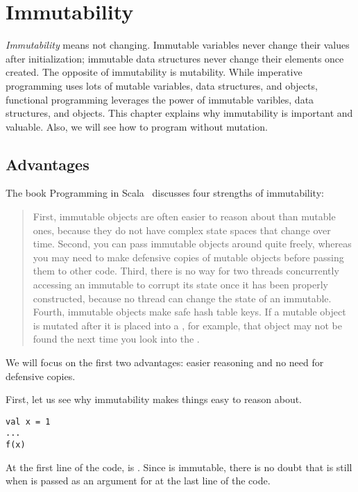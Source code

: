 \setchapterpreamble[u]{\margintoc}
\chapter{Immutability}

\textit{Immutability} means not changing.
Immutable variables never change their values
after initialization; immutable data structures never change their elements
once created. The opposite of immutability is mutability. While imperative
programming uses lots of mutable variables, data structures, and objects,
functional programming leverages the power of immutable varibles, data
structures, and objects. This chapter explains why immutability is important and
valuable. Also, we will see how to program without mutation.

\section{Advantages}

The book Programming in Scala~\cite{programming-in-scala}
discusses four strengths of immutability:

\begin{quote}
First, immutable objects are often easier to reason about than mutable ones,
because they do not have complex state spaces that change over time. Second, you
can pass immutable objects around quite freely, whereas you may need to make
defensive copies of mutable objects before passing them to other code. Third,
there is no way for two threads concurrently accessing an immutable to corrupt
its state once it has been properly constructed, because no thread can change the
state of an immutable. Fourth, immutable objects make safe hash table keys. If a
mutable object is mutated after it is placed into a , for example,
that object may not be found the next time you look into the .
\end{quote}

We will focus on the first two advantages:
easier reasoning and no need for defensive copies.

First, let us see why immutability makes things easy to reason about.

\begin{verbatim}
val x = 1
...
f(x)
\end{verbatim}

At the first line of the code,  is . Since  is immutable,
there is no doubt that  is still  when  is passed as an
argument for  at the last line of the code.

